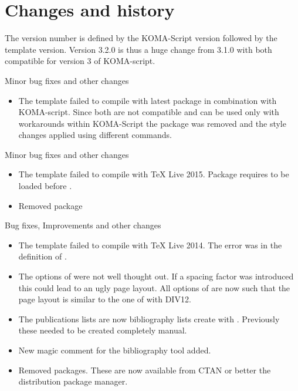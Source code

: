 
\chapter{Changes and history}
\label{appendix:doc:changes}

The version number is defined by the KOMA-Script version followed by the template version. 
Version 3.2.0 is thus a huge change from 3.1.0 with both compatible for version 3 of KOMA-script.


Minor bug fixes and other changes
\begin{itemize}
\item The template failed to compile with latest package  in combination with KOMA-script. Since both are not compatible and can be used only with workarounds within KOMA-Script the package  was removed and the style changes applied using different commands.
\end{itemize}


Minor bug fixes and other changes
\begin{itemize}
\item The template failed to compile with TeX Live 2015. Package  requires  to be loaded before . 
\item Removed package 
\end{itemize}


Bug fixes, Improvements and other changes
\begin{itemize}
\item The template failed to compile with TeX Live 2014. The error was in the definition of . 
\item The options of  were not well thought out. If a spacing factor was introduced this could lead to an ugly page layout. All options of  are now such that the page layout is similar to the one of  with DIV12. 
\item The publications lists are now bibliography lists create with . Previously these needed to be created completely manual.
\item New magic comment for the bibliography tool added.
\item Removed packages. These are now available from CTAN or better the distribution package manager. 
\end{itemize}


